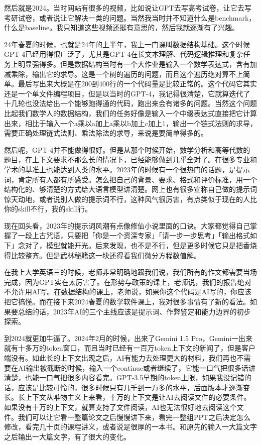 然后就是2024。当时网站有很多的视频，比如说让GPT去写高考试卷，让它去写考研试卷，或者说让它解决一类的问题。当然我当时并不知道什么是benchmark，什么是baseline。我只知道这些视频还挺有意思的，然后我就逐渐有了兴趣。

24年春夏的时候，也就是24年的上半年，我上一门课叫数据结构基础。这个时候GPT-4已经用得很广泛了，尤其是GPT-4在长文本理解、代码逻辑推理和复杂任务上明显强得多。但是数据结构当时有一个大作业是输入一个数学表达式，含有加减乘除，输出它的求导。这是一个树的遍历的问题，而且这个遍历绝对算不上简单。最后写出来大概是在200到400行的一个代码量是比较正常的。这个代码它其实还是一个单文件编程项目，但是以当时的GPT-4，我记得很清楚，它就算迭代了十几轮也没法给出一个能够跑得通的代码，跑出来会有诸多的问题。当然这个问题比起我们数学人的数据结构，我们的任务好像是输入一个中缀表达式直接把它计算出来，相比于输入一个a乘以a加上a乘以b加上c加上1，输出一个链式法则的求导，需要正确处理链式法则、乘法除法的求导，来说是要简单得多的。

然后呢，GPT-4并不能做得很好。但是从那个时候开始，数学分析和高等代数的题目，在上下文要求不那么长的情况下，已经能够做到几乎全对了。在很多专业和学术的基准上也能达到人类的水平。2023年的时候有一个很热门的话题，是提示词，肯定所有人都有所感受。怎么把自己的背景、要求、格式和评价标准，用一个结构化的、够清楚的方式给大语言模型讲清楚。网上也有很多宣称自己做的提示词惊天动地，或者说别人做的提示词不行，这种风气很厉害，有点类似于现在的人比你的skill不行，我的skill行。

现在回头看，2023年的提示词风潮有点像修仙小说里面的口诀。大家都觉得自己掌握了一段上古咒语，只要把「你是一个资深专家」「请一步一步思考」「输出格式如下」念对了，模型就能开光。后来发现，也不是不行，但是更多时候它只是把香烧得比较整齐。但是武林秘籍这一块还得看我们微分方程数值解。

在我上大学英语三的时候，老师非常明确地跟我们说，我们所有的作文都需要当场完成，因为GPT实在太厉害了。在形势与政策的课上，老师说，我们的报告绝对不允许用AI写。在数据结构的课上，老师说，如果你这个代码是AI写的，你应该把它搞懂。而在接下来2024春夏的数学软件课上，我对很多事情有了新的看法。如果要总结的话，2023年AI的三个主线应该是提示词、作弊鉴定和能力边界的初步探索。

到2024就更加牛逼了。2024年2月的时候，出来了Gemini 1.5 Pro，Gemini一出来就有十多万的token窗口，而且当时已经有一百万token上下文的新闻了，但是客户端没有。如此长的上下文出现之后，AI有能力去处理更大的材料，我们再也不需要在AI输出被截断的时候，输入一个continue或者继续了，它能一口气把很多话讲清楚，也能一口气把很多内容看完。GPT-3.5早期的token上限，如果我没记错的话，应该是比较可怜的，很多时候只有几千到一万多的水平，后面版本才逐渐变长。长上下文从唯物主义上来看，十万的上下文是让AI去阅读文件的必要条件。如果没有十万的上下文，就算支持了文件阅读，AI也无法很好地去阅读这个文件。我们可以让它看一整篇论文之后慢慢讲下来，看完一整组PPT之后决定怎么修改，看完几十页的课程讲义，或者说是很厚的一本书。和原先的输入一大篇文字之后输出一大篇文字，有了很大的变化。

